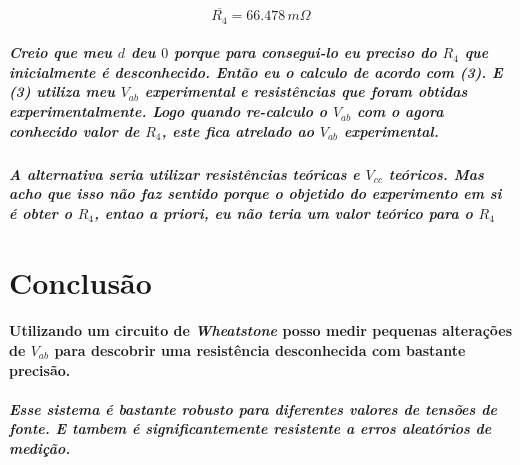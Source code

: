 \documentclass[12pt,twoside, a4paper, twocolumn]{article}
\begin{document}
\begin{center}
\end{center}

\begin{equation}
    \overline{R_4} = 66.478\, m\varOmega
\end{equation}

\subparagraph*{Creio que meu $d$ deu $0$ porque para consegui-lo eu preciso do $R_4$ que inicialmente é desconhecido. Então eu o calculo de acordo com (3). E (3) utiliza meu $V_{ab}$ experimental e resistências que foram obtidas experimentalmente. Logo quando re-calculo o $V_{ab}$ com o agora conhecido valor de $R_4$, este fica atrelado ao $V_{ab}$ experimental.}
\subparagraph*{A alternativa seria utilizar resistências teóricas e $V_{cc}$ teóricos. Mas acho que isso não faz sentido porque o objetido do experimento em si é obter o $R_4$, entao a priori, eu não teria um valor teórico para o $R_4$}

\section{Conclusão}

\paragraph*{Utilizando um circuito de \emph{Wheatstone} posso medir pequenas alterações de $V_{ab}$ para descobrir uma resistência desconhecida com bastante precisão.}

\subparagraph*{Esse sistema é bastante robusto para diferentes valores de tensões de fonte. E tambem é significantemente resistente a erros aleatórios de medição.}
\end{document}

